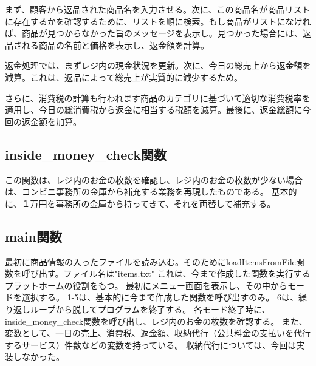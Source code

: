 \documentclass[a4j,11pt]{jarticle}
\begin{document}
まず、顧客から返品された商品名を入力させる。次に、この商品名が商品リストに存在するかを確認するために、リストを順に検索。もし商品がリストになければ、商品が見つからなかった旨のメッセージを表示し。見つかった場合には、返品される商品の名前と価格を表示し、返金額を計算。

返金処理では、まずレジ内の現金状況を更新。次に、今日の総売上から返金額を減算。これは、返品によって総売上が実質的に減少するため。

さらに、消費税の計算も行われます商品のカテゴリに基づいて適切な消費税率を適用し、今日の総消費税から返金に相当する税額を減算。最後に、返金総額に今回の返金額を加算。
\subsection{inside\_money\_check関数}
この関数は、レジ内のお金の枚数を確認し、レジ内のお金の枚数が少ない場合は、コンビニ事務所の金庫から補充する業務を再現したものである。
基本的に、１万円を事務所の金庫から持ってきて、それを両替して補充する。
\subsection{main関数}
最初に商品情報の入ったファイルを読み込む。そのためにloadItemsFromFile関数を呼び出す。ファイル名は"items.txt"
これは、今まで作成した関数を実行するプラットホームの役割をもつ。
最初にメニュー画面を表示し、その中からモードを選択する。
1-5は、基本的に今まで作成した関数を呼び出すのみ。
6は、繰り返しループから脱してプログラムを終了する。
各モード終了時に、inside\_money\_check関数を呼び出し、レジ内のお金の枚数を確認する。
また、変数として、一日の売上、消費税、返金額、収納代行（公共料金の支払いを代行するサービス）件数などの変数を持っている。
収納代行については、今回は実装しなかった。
\end{document}
